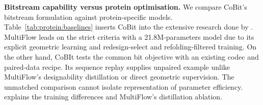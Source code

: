 


\textbf{Bitstream capability versus protein optimisation.} We compare CoBit's bitstream formulation against protein-specific models. Table~\ref{tab:protein:baselines} inserts CoBit into the extensive research done by \citep{protein:simpledesign}. MultiFlow \cite{campbell2024multiflow} leads on the strict criteria with a 21.8M-parameters model due to its explicit geometric learning and redesign-select and refolding-filtered training. On the other hand, CoBIt tests the common bit objective with an existing codec and paired-data recipe. Its sequence replay supplies unpaired example unlike MultiFlow's designability distillation or direct geometric supervision. The unmatched comparison cannot isolate representation of parameter efficiency.  explains the training differences and MultiFlow's distillation ablation.  

